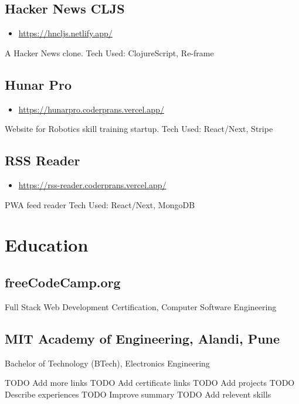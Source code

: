 \documentclass[11pt]{article}
\begin{document}
\subsection*{Hacker News CLJS}
\label{sec:org2e590fb}
\begin{itemize}
\item \url{https://hncljs.netlify.app/}
\end{itemize}
A Hacker News clone.
Tech Used: ClojureScript, Re-frame


\subsection*{Hunar Pro}
\label{sec:org1289954}
\begin{itemize}
\item \url{https://hunarpro.coderprans.vercel.app/}
\end{itemize}
Website for Robotics skill training startup.
Tech Used: React/Next, Stripe


\subsection*{RSS Reader}
\label{sec:org8beb66e}
\begin{itemize}
\item \url{https://rss-reader.coderprans.vercel.app/}
\end{itemize}
PWA feed reader
Tech Used: React/Next, MongoDB


\section*{Education}
\label{sec:org5f9c6bd}
\subsection*{freeCodeCamp.org}
\label{sec:org97df945}
Full Stack Web Development Certification, Computer Software Engineering


\subsection*{MIT Academy of Engineering, Alandi, Pune}
\label{sec:org2116ee6}
Bachelor of Technology (BTech), Electronics Engineering



\begin{todos}
TODO Add more links
TODO Add certificate links
TODO Add projects
TODO Describe experiences
TODO Improve summary
TODO Add relevent skills
\end{todos}
\end{document}
